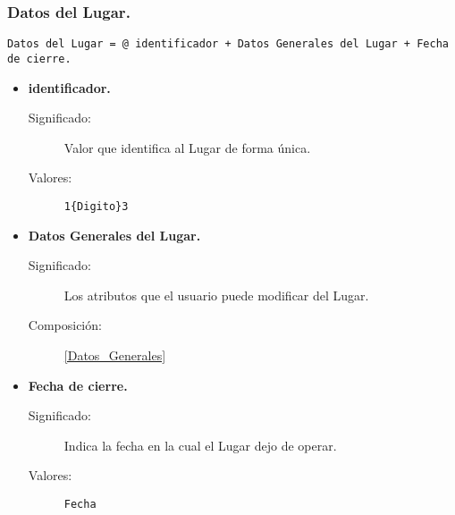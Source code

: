 \subsubsection{Datos del Lugar.}\label{Datos_Lugar}
\begin{lstlisting}
Datos del Lugar = @ identificador + Datos Generales del Lugar + Fecha de cierre.
\end{lstlisting}
	\begin{itemize}
		\item \textbf{identificador.}
			\begin{description}
				\item [Significado:] Valor que identifica al Lugar de forma única.
				\item [Valores:]{\begin{lstlisting}
1{Digito}3\end{lstlisting}}
			\end{description}
		\item \textbf{Datos Generales del Lugar.}
			\begin{description}
				\item [Significado:] Los atributos que el usuario puede modificar del Lugar.
				\item [Composición:] \ref{Datos_Generales}
			\end{description}
		\item \textbf{Fecha de cierre.}
			\begin{description}
				\item [Significado:] Indica la fecha en la cual el Lugar dejo de operar.
				\item [Valores:]{\begin{lstlisting}
Fecha\end{lstlisting}}
			\end{description}
	\end{itemize}


